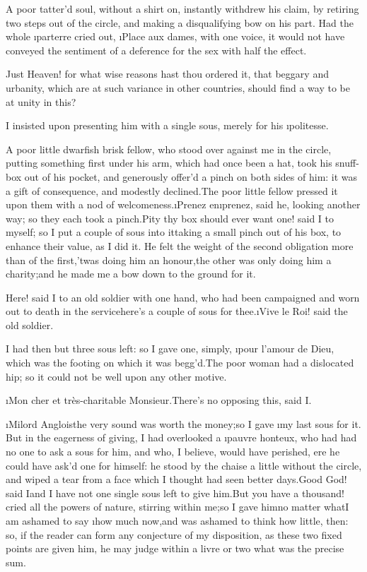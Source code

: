 \documentclass[twoside]{article}
\begin{document}
A poor tatter’d soul, without a shirt on, instantly withdrew his claim,
by retiring two steps out of the circle, and making a disqualifying bow
on his part.  Had the whole \i{parterre} cried out, \i{Place aux dames}, with
one voice, it would not have conveyed the sentiment of a deference for
the sex with half the effect.

Just Heaven! for what wise reasons hast thou ordered it, that beggary and
urbanity, which are at such variance in other countries, should find a
way to be at unity in this?

\tsk I insisted upon presenting him with a single sous, merely for his
\i{politesse}.

A poor little dwarfish brisk fellow, who stood over against me in the
circle, putting something first under his arm, which had once been a hat,
took his snuff-box out of his pocket, and generously offer’d a pinch on
both sides of him: it was a gift of consequence, and modestly
declined.\tsk The poor little fellow pressed it upon them with a nod of
welcomeness.\tsk \i{Prenez en}\tsk \i{prenez}, said he, looking another way; so they
each took a pinch.\tsk Pity thy box should ever want one! said I to myself;
so I put a couple of sous into it\tsk taking a small pinch out of his box, to
enhance their value, as I did it.  He felt the weight of the second
obligation more than of the first,\tsk ’twas doing him an honour,\tsk the other
was only doing him a charity;\tsk and he made me a bow down to the ground for
it.

\tsk Here! said I to an old soldier with one hand, who had been campaigned
and worn out to death in the service\tsk here’s a couple of sous for
thee.\tsk \i{Vive le Roi}! said the old soldier.

I had then but three sous left: so I gave one, simply, \i{pour l’amour de
Dieu}, which was the footing on which it was begg’d.\tsk The poor woman had a
dislocated hip; so it could not be well upon any other motive.

\i{Mon cher et très-charitable Monsieur}.\tsk There’s no opposing this, said I.

\i{Milord Anglois}\tsk the very sound was worth the money;\tsk so I gave \i{my last
sous for it}.  But in the eagerness of giving, I had overlooked a \i{pauvre
honteux}, who had had no one to ask a sous for him, and who, I believe,
would have perished, ere he could have ask’d one for himself: he stood by
the chaise a little without the circle, and wiped a tear from a face
which I thought had seen better days.\tsk Good God! said I\tsk and I have not one
single sous left to give him.\tsk But you have a thousand! cried all the
powers of nature, stirring within me;\tsk so I gave him\tsk no matter what\tsk I am
ashamed to say \i{how much} now,\tsk and was ashamed to think how little, then:
so, if the reader can form any conjecture of my disposition, as these two
fixed points are given him, he may judge within a livre or two what was
the precise sum.
\end{document}
